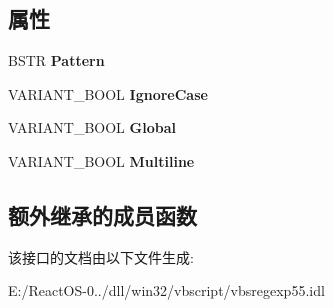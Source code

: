 \subsection*{属性}
\begin{DoxyCompactItemize}
\item 
\mbox{\label{interface_v_b_script___reg_exp__55_1_1_i_reg_exp2_ab4898cabc6de4039cb6a3f42f04b4204}} 
B\+S\+TR {\bfseries Pattern}
\item 
\mbox{\label{interface_v_b_script___reg_exp__55_1_1_i_reg_exp2_a5f9196564663e7e1cbe087f1436c8ba6}} 
V\+A\+R\+I\+A\+N\+T\+\_\+\+B\+O\+OL {\bfseries Ignore\+Case}
\item 
\mbox{\label{interface_v_b_script___reg_exp__55_1_1_i_reg_exp2_a10abb2555f20e1e3ec61ec4b457951a1}} 
V\+A\+R\+I\+A\+N\+T\+\_\+\+B\+O\+OL {\bfseries Global}
\item 
\mbox{\label{interface_v_b_script___reg_exp__55_1_1_i_reg_exp2_ad51a8e114134c437c14d5dd8f5536910}} 
V\+A\+R\+I\+A\+N\+T\+\_\+\+B\+O\+OL {\bfseries Multiline}
\end{DoxyCompactItemize}
\subsection*{额外继承的成员函数}


该接口的文档由以下文件生成\+:\begin{DoxyCompactItemize}
\item 
E\+:/\+React\+O\+S-\/0../dll/win32/vbscript/vbsregexp55.\+idl\end{DoxyCompactItemize}
